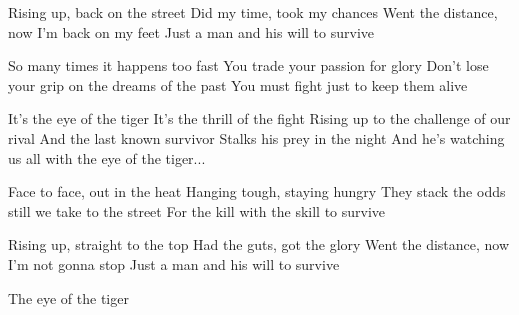 \begin{verse*}
Rising up, back on the street
Did my time, took my chances
Went the distance, now I'm back on my feet
Just a man and his will to survive
\end{verse*}

\begin{verse*}
So many times it happens too fast
You trade your passion for glory
Don't lose your grip 
on the dreams of the past
You must fight just to keep them alive
\end{verse*}

\begin{chorus}
It's the eye of the tiger
It's the thrill of the fight
Rising up to the challenge of our rival
And the last known survivor
Stalks his prey in the night
And he's watching us all with the eye
of the tiger...
\end{chorus}

\begin{verse*}
Face to face, out in the heat
Hanging tough, staying hungry
They stack the odds
still we take to the street
For the kill with the skill to survive
\end{verse*}

\thechorus

\begin{verse*}
Rising up, straight to the top
Had the guts, got the glory
Went the distance, now I'm not gonna stop
Just a man and his will to survive
\end{verse*}

\thechorus

\begin{verse*}
The eye of the tiger 
\end{verse*}
